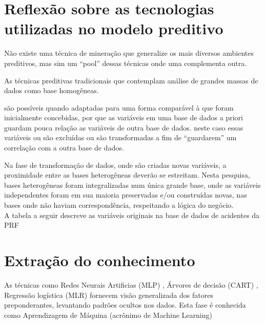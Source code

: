 
\section{Reflexão sobre as tecnologias utilizadas no modelo preditivo}\label{result}

Não existe uma técnica de mineração que generalize os mais diversos ambientes preditivos, mas sim um ``pool'' dessas técnicas onde uma complementa outra.

As técnicas preditivas tradicionais que contemplam análise de grandes massas de dados como base homogêneas.

são possíveis quando adaptadas para uma forma comparável à que
foram inicialmente concebidas, por que as variáveis em uma base de dados a priori guardam pouca relação as variáveis de outra base de dados.
neste caso essas variáveis ou são excluídas ou são transformadas a fim de ``guardarem'' um correlação com a outra base de dados. 

Na fase de transformação de dados, onde são criadas novas variáveis, a proximidade entre as
bases heterogêneas deverão se estreitam. 
Nesta pesquisa, bases heterogêneas foram integralizadas num única grande base, onde as variáveis independentes foram
em sua maioria preservadas e/ou construídas novas, nas bases onde não haviam correspondência, respeitando a lógica do negócio.\\
A tabela a seguir descreve as variáveis originais na base de dados de acidentes da PRF 


\section{Extração do conhecimento}

As técnicas como Redes Neurais Artificias (MLP) \cite{DecisaoCredito}, Árvores de decisão (CART) \cite{DataMining}, Regressão logística (MLR) 
\cite{RegrecaoLog} fornecem visão generalizada dos fatores preponderantes, levantando padrões ocultos nos dados. Esta fase é conhecida como 
Aprendizagem de Máquina (acrônimo de Machine Learning)

